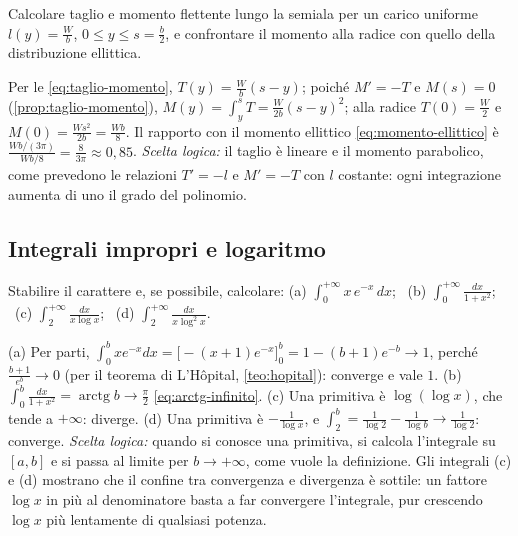 \begin{esercizio}
Calcolare taglio e momento flettente lungo la semiala per un carico uniforme
$l(y)=\frac Wb$, $0\le y\le s=\frac b2$, e confrontare il momento alla radice con quello della
distribuzione ellittica.
\begin{soluzione}
Per le \eqref{eq:taglio-momento}, $T(y)=\frac Wb(s-y)$; poiché $M'=-T$ e $M(s)=0$
(\cref{prop:taglio-momento}), $M(y)=\int_{y}^{s}T=\frac W{2b}(s-y)^{2}$; alla
radice $T(0)=\frac W2$ e $M(0)=\frac{Ws^{2}}{2b}=\frac{Wb}8$. Il rapporto con il momento ellittico
\eqref{eq:momento-ellittico} è $\frac{Wb/(3\pi)}{Wb/8}=\frac8{3\pi}\approx0{,}85$. \emph{Scelta logica:}
il taglio è lineare e il momento parabolico, come prevedono le relazioni $T'=-l$ e $M'=-T$
con $l$ costante: ogni integrazione aumenta di uno il grado del polinomio.
\end{soluzione}
\end{esercizio}

\subsection*{Integrali impropri e logaritmo}

\begin{esercizio}
Stabilire il carattere e, se possibile, calcolare: (a) $\int_{0}^{+\infty}x\,e^{-x}\,dx$; \
(b) $\int_{0}^{+\infty}\frac{dx}{1+x^{2}}$; \ (c) $\int_{2}^{+\infty}\frac{dx}{x\log x}$; \ (d) $\int_{2}^{+\infty}\frac{dx}{x\log^{2}x}$.
\begin{soluzione}
(a) Per parti, $\int_{0}^{b}xe^{-x}dx=\bigl[-(x+1)e^{-x}\bigr]_{0}^{b}=1-(b+1)e^{-b}\to1$, perché
$\frac{b+1}{e^{b}}\to0$ (per il teorema di L'Hôpital, \cref{teo:hopital}): converge e vale
$1$.
(b) $\int_{0}^{b}\frac{dx}{1+x^{2}}=\operatorname{arctg}b\to\frac\pi2$ \eqref{eq:arctg-infinito}. (c) Una primitiva è
$\log(\log x)$, che tende a $+\infty$: diverge. (d) Una primitiva è $-\frac1{\log x}$, e
$\int_{2}^{b}=\frac1{\log2}-\frac1{\log b}\to\frac1{\log2}$: converge. \emph{Scelta logica:} quando
si conosce una primitiva, si calcola l'integrale su $[a,b]$ e si passa al limite per
$b\to+\infty$, come vuole la definizione. Gli integrali (c) e (d) mostrano che il confine
tra convergenza e divergenza è sottile: un fattore $\log x$ in più al denominatore basta a
far convergere l'integrale, pur crescendo $\log x$ più lentamente di qualsiasi potenza.
\end{soluzione}
\end{esercizio}

